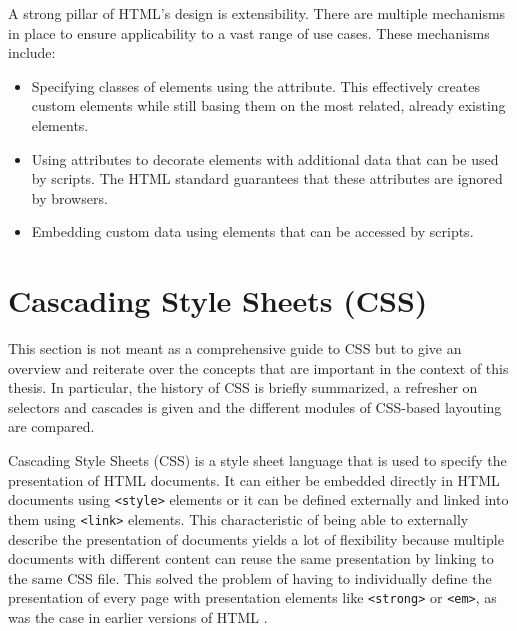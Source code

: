 A strong pillar of HTML's design is extensibility. There are multiple
mechanisms in place to ensure applicability to a vast range of use
cases. These mechanisms include:

\begin{itemize}
\item Specifying classes of elements using the 
  attribute. This effectively creates custom elements while still
  basing them on the most related, already existing elements.

\item Using  attributes to decorate elements with
  additional data that can be used by scripts. The HTML standard
  guarantees that these attributes are ignored by browsers.

\item Embedding custom data using 
  elements that can be accessed by scripts.
\end{itemize}






\section{Cascading Style Sheets (CSS)}
\label{sec:CSS}

This section is not meant as a comprehensive guide to CSS but to give an overview and reiterate over the concepts that are important in the context of this thesis. In particular, the history of CSS is briefly summarized, a refresher on selectors and cascades is given and the different modules of CSS-based layouting are compared.

Cascading Style Sheets (CSS) is a style sheet language that is used to specify the presentation of HTML documents. It can either be embedded directly in HTML documents using \lstinline{<style>} elements or it can be defined externally and linked into them using \lstinline{<link>} elements. This characteristic of being able to externally describe the presentation of documents yields a lot of flexibility because multiple documents with different content can reuse the same presentation by linking to the same CSS file. This solved the problem of having to individually define the presentation of every page with presentation elements like \lstinline{<strong>} or \lstinline{<em>}, as was the case in earlier versions of HTML \parencite{HTML32}.

